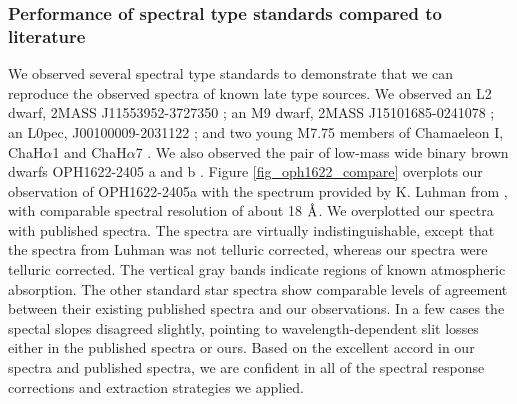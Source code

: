 \subsubsection{Performance of spectral type standards compared to literature}
We observed several spectral type standards to demonstrate that we can reproduce the observed spectra of known late type sources.  We observed an L2 dwarf, 2MASS J11553952-3727350 \citep{2008AJ....136.1290R}; an M9 dwarf, 2MASS J15101685-0241078 \citep{2008AJ....136.1290R}; an L0pec, J00100009-2031122 \citep{2007AJ....133..439C}; and two young M7.75 members of Chamaeleon I, ChaH$\alpha$1 and ChaH$\alpha$7 \citep{2004ApJ...602..816L}.  We also observed the pair of low-mass wide binary brown dwarfs OPH1622-2405 a and b \citep{2006PhDT.........2A,2007ApJ...659.1629L}.  Figure \ref{fig_oph1622_compare} overplots our observation of OPH1622-2405a with the spectrum provided by K. Luhman from \citet{2007ApJ...659.1629L}, with comparable spectral resolution of about 18 $\mbox{\normalfont\AA}$.  We overplotted our spectra with published spectra.  The spectra are virtually indistinguishable, except that the spectra from Luhman was not telluric corrected, whereas our spectra were telluric corrected.  The vertical gray bands indicate regions of known atmospheric absorption.  The other standard star spectra show comparable levels of agreement between their existing published spectra and our observations.  In a few cases the spectal slopes disagreed slightly, pointing to wavelength-dependent slit losses either in the published spectra or ours.  Based on the excellent accord in our spectra and published spectra, we are confident in all of the spectral response corrections and extraction strategies we applied.  

